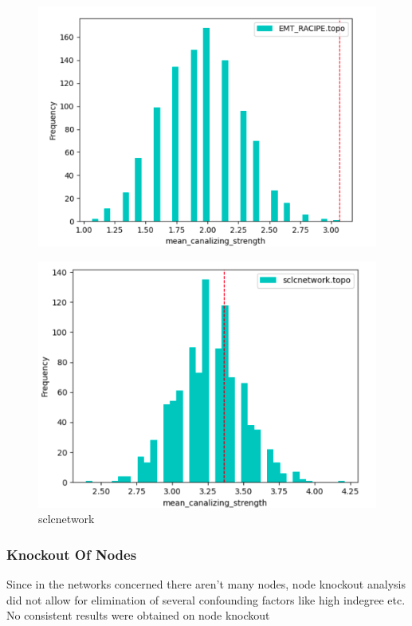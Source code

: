 \documentclass[t]{beamer}
\begin{document}
\begin{frame}
\begin{figure}[H]
	\includegraphics[scale=0.4]{img/emt_racipe_2.png}
	
\end{figure}


\end{frame}

\begin{frame}
	\begin{figure}[H]
		\includegraphics[scale=0.4]{img/melanoma_outcan.png}
		\caption{sclcnetwork }
	\end{figure}

\end{frame}


\begin{frame}
	\frametitle{Knockout Of Nodes}
	Since in the networks concerned there aren't many nodes, node knockout analysis did not allow for elimination of several confounding factors like high indegree etc. No consistent results were obtained on node knockout

\end{frame}
\end{document}
